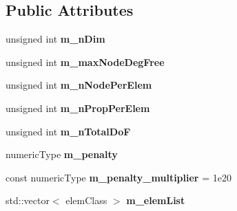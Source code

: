 \subsection*{Public Attributes}
\begin{DoxyCompactItemize}
\item 
\mbox{\label{classbase_structural_analysis_class_ad40dbcb71e338b8cd998ad4bf80fef1a}} 
unsigned int {\bfseries m\+\_\+n\+Dim}
\item 
\mbox{\label{classbase_structural_analysis_class_af7ea30f9a3e3c353eeaba07c31c445a0}} 
unsigned int {\bfseries m\+\_\+max\+Node\+Deg\+Free}
\item 
\mbox{\label{classbase_structural_analysis_class_aed50959156544fc3d15af79eb38d6ae0}} 
unsigned int {\bfseries m\+\_\+n\+Node\+Per\+Elem}
\item 
\mbox{\label{classbase_structural_analysis_class_abec1d294a55c84f5ef8e227a69d4e5f4}} 
unsigned int {\bfseries m\+\_\+n\+Prop\+Per\+Elem}
\item 
\mbox{\label{classbase_structural_analysis_class_a9c1dbd7cb8a65f514211505672854330}} 
unsigned int {\bfseries m\+\_\+n\+Total\+DoF}
\item 
\mbox{\label{classbase_structural_analysis_class_a7e59de3567f891a9e6ea32378f0d7435}} 
numeric\+Type {\bfseries m\+\_\+penalty}
\item 
\mbox{\label{classbase_structural_analysis_class_a5366e9b75e98f8360ac90c72ea121dcd}} 
const numeric\+Type {\bfseries m\+\_\+penalty\+\_\+multiplier} = 1e20
\item 
\mbox{\label{classbase_structural_analysis_class_a80ad4a3ce359b44670321a7d4cefef58}} 
std\+::vector$<$ elem\+Class $>$ {\bfseries m\+\_\+elem\+List}
\item 
\mbox{\label{classbase_structural_analysis_class_a53cf915dc1fc9fcb8ff58b20bfac5632}} 

\end{DoxyCompactItemize}

